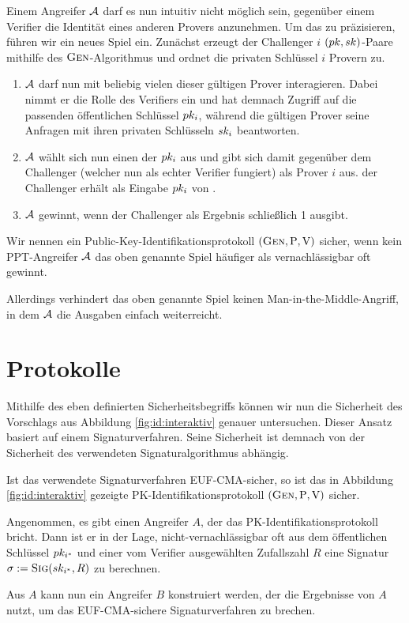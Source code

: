Einem Angreifer $\mathcal{A}$ darf es nun intuitiv nicht möglich sein, gegenüber
einem Verifier die Identität eines anderen Provers anzunehmen. Um das zu
präzisieren, führen wir ein neues Spiel ein. Zunächst erzeugt der Challenger $i$
$(pk, sk)$-Paare mithilfe des $\textsc{Gen}$-Algorithmus und ordnet die privaten Schlüssel $i$ Provern zu.
\begin{enumerate}
  \item $\mathcal{A}$ darf nun mit beliebig vielen dieser gültigen Prover
interagieren. Dabei nimmt er die Rolle des Verifiers ein und hat demnach
Zugriff auf die passenden öffentlichen Schlüssel $pk_i$, während die
gültigen Prover seine Anfragen mit ihren privaten Schlüsseln $sk_i$
beantworten.
  \item $\mathcal{A}$ wählt sich nun einen der $pk_{i}$ aus und gibt sich
    damit gegenüber dem Challenger (welcher nun als \glqq echter\grqq
    Verifier fungiert) als Prover $i$ aus. der Challenger erhält als
    Eingabe $pk_i$ von \A.
  \item $\mathcal{A}$ gewinnt, wenn der Challenger als Ergebnis schließlich 1
ausgibt.
\end{enumerate} Wir nennen ein Public-Key-Identifikationsprotokoll
$(\textsc{Gen}, \mathrm{P}, \mathrm{V})$ sicher, wenn kein PPT-Angreifer $\mathcal{A}$
das oben genannte Spiel häufiger als vernachlässigbar oft gewinnt.

Allerdings verhindert das oben genannte Spiel keinen
Man-in-the-Middle-Angriff, in dem $\mathcal{A}$ die Ausgaben einfach
weiterreicht.


\section{Protokolle}\label{sec:id:protokolle}
Mithilfe des eben definierten Sicherheitsbegriffs können wir nun die
Sicherheit des Vorschlags aus Abbildung \ref{fig:id:interaktiv} genauer untersuchen.
Dieser Ansatz basiert auf einem Signaturverfahren. Seine
Sicherheit ist demnach von der Sicherheit des verwendeten
Signaturalgorithmus abhängig.~\\

\begin{theorem} Ist das verwendete Signaturverfahren EUF-CMA-sicher, so
ist das in Abbildung \ref{fig:id:interaktiv} gezeigte
PK-Identifikationsprotokoll $(\textsc{Gen}, \mathrm{P}, \mathrm{V})$ sicher.~\\
\end{theorem}
\begin{beweisidee} Angenommen, es gibt einen Angreifer $A$, der das
PK-Identifikationsprotokoll bricht. Dann ist er in der Lage,
nicht-vernachlässigbar oft aus dem öffentlichen Schlüssel $pk_{i^*}$
und einer vom Verifier ausgewählten Zufallszahl $R$ eine Signatur
$\sigma := \textsc{Sig}(sk_{i^*}, R)$ zu berechnen.

Aus $A$ kann nun ein Angreifer $B$ konstruiert werden, der die
Ergebnisse von $A$ nutzt, um das EUF-CMA-sichere Signaturverfahren zu
brechen.~\\
\end{beweisidee}

